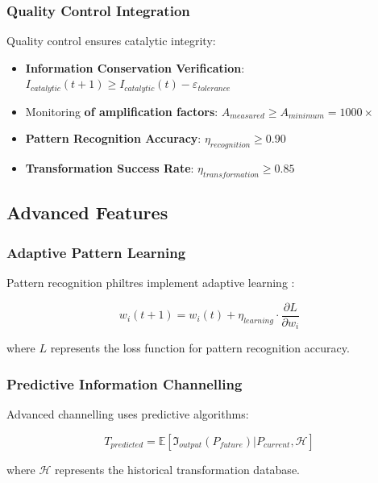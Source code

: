 \documentclass[12pt,a4paper]{article}
\begin{document}
\subsubsection{Quality Control Integration}

Quality control ensures catalytic integrity:

\begin{itemize}
\item \textbf{Information Conservation Verification}: $I_{catalytic}(t+1) \geq I_{catalytic}(t) - \varepsilon_{tolerance}$
\item Monitoring \textbf{of amplification factors}: $A_{measured} \geq A_{minimum} = 1000\times$
\item \textbf{Pattern Recognition Accuracy}: $\eta_{recognition} \geq 0.90$
\item \textbf{Transformation Success Rate}: $\eta_{transformation} \geq 0.85$
\end{itemize}

\subsection{Advanced Features}

\subsubsection{Adaptive Pattern Learning}

Pattern recognition philtres implement adaptive learning \cite{bishop2006pattern}:

\begin{equation}
w_i(t+1) = w_i(t) + \eta_{learning} \cdot \frac{\partial L}{\partial w_i}
\end{equation}

where $L$ represents the loss function for pattern recognition accuracy.

\subsubsection{Predictive Information Channelling}

Advanced channelling uses predictive algorithms:

\begin{equation}
T_{predicted} = \mathbb{E}[\mathfrak{I}_{output}(P_{future}) | P_{current}, \mathcal{H}]
\end{equation}

where $\mathcal{H}$ represents the historical transformation database.
\end{document}
